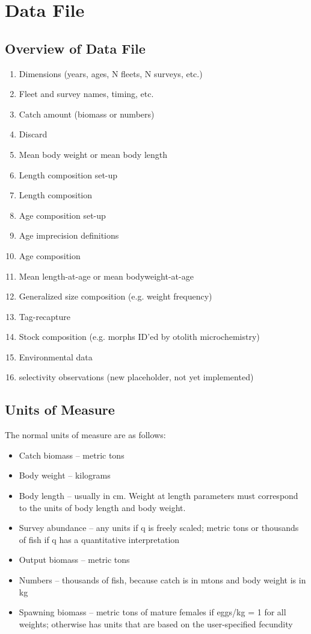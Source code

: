 \section{Data File}
\subsection{Overview of Data File}
	\begin{enumerate}
		\item Dimensions (years, ages, N fleets, N surveys, etc.)
		\item Fleet and survey names, timing, etc.
		\item Catch amount (biomass or numbers)
		\item Discard
		\item Mean body weight or mean body length
		\item Length composition set-up
		\item Length composition
		\item Age composition set-up
		\item Age imprecision definitions
		\item Age composition
		\item Mean length-at-age or mean bodyweight-at-age
		\item Generalized size composition (e.g. weight frequency)
		\item Tag-recapture
		\item Stock composition (e.g. morphs ID'ed by otolith microchemistry)
		\item Environmental data
		\item selectivity observations (new placeholder, not yet implemented)
	\end{enumerate}
	
\hypertarget{UnitsOfMeasure}{}
\subsection{Units of Measure}
The normal units of measure are as follows:
\begin{itemize}
	\item Catch biomass -- metric tons	
	\item Body weight -- kilograms	
	\item Body length -- usually in cm. Weight at length parameters must correspond to the units of body length and body weight.	
	\item Survey abundance -- any units if q is freely scaled; metric tons or thousands of fish if q has a quantitative interpretation	
	\item Output biomass -- metric tons	
	\item Numbers -- thousands of fish, because catch is in mtons and body weight is in kg	
	\item Spawning biomass -- metric tons of mature females if eggs/kg = 1 for all weights; otherwise has units that are based on the user-specified fecundity	
\end{itemize}

